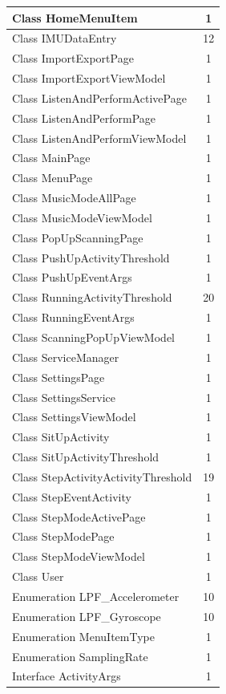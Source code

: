 \documentclass[a4paper,12pt]{article}
\begin{document}
\begin{center}
\begin{longtable}{|p{14cm}|c|}
\hline
Class HomeMenuItem & 1\\
\hline
Class IMUDataEntry & 12\\
\hline
Class ImportExportPage & 1\\
\hline
Class ImportExportViewModel & 1\\
\hline
Class ListenAndPerformActivePage & 1\\
\hline
Class ListenAndPerformPage & 1\\
\hline
Class ListenAndPerformViewModel & 1\\
\hline
Class MainPage & 1\\
\hline
Class MenuPage & 1\\
\hline
Class MusicModeAllPage & 1\\
\hline
Class MusicModeViewModel & 1\\
\hline
Class PopUpScanningPage & 1\\
\hline
Class PushUpActivityThreshold & 1\\
\hline
Class PushUpEventArgs & 1\\
\hline
Class RunningActivityThreshold & 20\\
\hline
Class RunningEventArgs & 1\\
\hline
Class ScanningPopUpViewModel & 1\\
\hline
Class ServiceManager & 1\\
\hline
Class SettingsPage & 1\\
\hline
Class SettingsService & 1\\
\hline
Class SettingsViewModel & 1\\
\hline
Class SitUpActivity & 1\\
\hline
Class SitUpActivityThreshold & 1\\
\hline
Class StepActivityActivityThreshold & 19\\
\hline
Class StepEventActivity & 1\\
\hline
Class StepModeActivePage & 1\\
\hline
Class StepModePage & 1\\
\hline
Class StepModeViewModel & 1\\
\hline
Class User & 1\\
\hline
Enumeration LPF\_Accelerometer & 10\\
\hline
Enumeration LPF\_Gyroscope & 10\\
\hline
Enumeration MenuItemType & 1\\
\hline
Enumeration SamplingRate & 1\\
\hline
Interface ActivityArgs & 1\\

\end{longtable}
\end{center}
\end{document}
